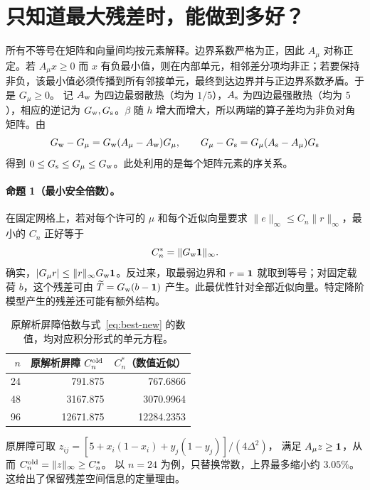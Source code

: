 \section{只知道最大残差时，能做到多好？}
所有不等号在矩阵和向量间均按元素解释。边界系数严格为正，因此 $A_\mu$ 对称正定。若 $A_\mu x\ge0$ 而 $x$ 有负最小值，则在内部单元，相邻差分项均非正；若要保持非负，该最小值必须传播到所有邻接单元，最终到达边界并与正边界系数矛盾。于是 $G_\mu\ge0$。
记 $A_{\rm w}$ 为四边最弱散热（均为 $1/5$），$A_{\rm s}$ 为四边最强散热（均为 $5$），相应的逆记为 $G_{\rm w},G_{\rm s}$。$\beta$ 随 $h$ 增大而增大，所以两端的算子差均为非负对角矩阵。由
\begin{equation}
 G_{\rm w}-G_\mu=G_{\rm w}(A_\mu-A_{\rm w})G_\mu,\qquad
 G_\mu-G_{\rm s}=G_\mu(A_{\rm s}-A_\mu)G_{\rm s}
 \label{eq:order-new}
\end{equation}
得到 $0\le G_{\rm s}\le G_\mu\le G_{\rm w}$。此处利用的是每个矩阵元素的序关系。

\paragraph{命题 1（最小安全倍数）。}
在固定网格上，若对每个许可的 $\mu$ 和每个近似向量要求
$\|e\|_\infty\le C_n\|r\|_\infty$，最小的 $C_n$ 正好等于
\begin{equation}
 C_n^*=\|G_{\rm w}{\bf 1}\|_\infty . \label{eq:best-new}
\end{equation}
确实，$|G_\mu r|\le\|r\|_\infty G_{\rm w}{\bf1}$。反过来，取最弱边界和 $r={\bf1}$ 就取到等号；对固定载荷 $b$，这个残差可由 $\widetilde T=G_{\rm w}(b-{\bf1})$ 产生。此最优性针对全部近似向量。特定降阶模型产生的残差还可能有额外结构。

\begin{table}[ht]\centering\small
\caption{原解析屏障倍数与式~\eqref{eq:best-new} 的数值，均对应积分形式的单元方程。}
\begin{tabular}{rrr}\toprule
$n$ & 原解析屏障 $C_n^{\rm old}$ & $C_n^*$（数值近似）\\\midrule
24 & 791.875 & 767.6866\\
48 & 3167.875 & 3070.9964\\
96 & 12671.875 & 12284.2353\\\bottomrule\end{tabular}
\end{table}

原屏障可取 $z_{ij}=[5+x_i(1-x_i)+y_j(1-y_j)]/(4\Delta^2)$，
满足 $A_\mu z\ge{\bf1}$，从而 $C_n^{\rm old}=\|z\|_\infty\ge C_n^*$。
以 $n=24$ 为例，只替换常数，上界最多缩小约 $3.05\%$。
这给出了保留残差空间信息的定量理由。
